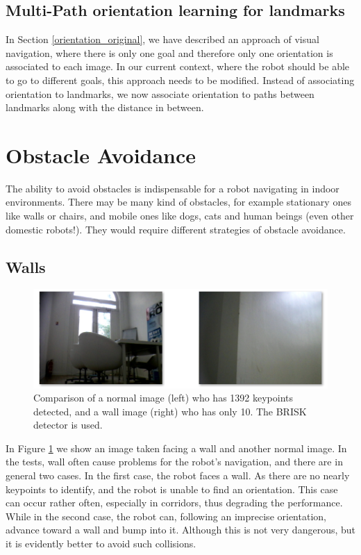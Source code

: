\documentclass[a4paper]{scrartcl}
\begin{document}
\subsection{Multi-Path orientation learning for landmarks}
In Section \ref{orientation_original}, we have described an approach of visual navigation, where there is only one goal and therefore only one orientation is associated to each image. In our current context, where the robot should be able to go to different goals, this approach needs to be modified. Instead of associating orientation to landmarks, we now associate orientation to paths between landmarks along with the distance in between.

\section{Obstacle Avoidance}
The ability to avoid obstacles is indispensable for a robot navigating in indoor environments. There may be many kind of obstacles, for example stationary ones like walls or chairs, and mobile ones like dogs, cats and human beings (even other domestic robots!). They would require different strategies of obstacle avoidance.


\subsection{Walls}
\begin{figure}[h]
\centering
  \includegraphics[width=0.8\linewidth]{img/wall.png}
  \caption{Comparison of a normal image (left) who has 1392 keypoints detected, and a wall image (right) who has only 10. The BRISK detector is used.}
\label{wall}
\end{figure}
In Figure \ref{wall} we show an image taken facing a wall and another normal image.
In the tests, wall often cause problems for the robot's navigation, and there
are in general two cases. In the first case, the robot faces a wall. As 
there are no nearly keypoints to identify, and the robot is unable to find an
orientation. This case can occur rather often, especially in corridors, thus 
degrading the performance. While in the second case, the robot can, following an imprecise orientation, advance toward a wall and bump into it. Although this is not very dangerous, but it is evidently better to avoid such collisions. 
\end{document}

